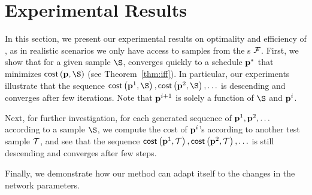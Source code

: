 \section{Experimental Results}\label{sec:exp}
In this section, we present our experimental results on optimality and efficiency of {\appoptimizer}, as in realistic scenarios we only have access to samples from the {\ins}s $\mathcal{F}$. First, we show that for a given sample $\S$, {\appoptimizer} converges quickly to a schedule $\mathbf{p}^*$ that minimizes $\cost{\p, \S}$ (see Theorem~\ref{thm:iff}). In particular, our experiments illustrate that the sequence $\cost{\p^1,\S}, \cost{\p^2, \S}, \ldots$ is descending and converges after few iterations.
Note that $\mathbf{p}^{i+1}$ is solely a function of $\S$ and $\mathbf{p}^i$. 

Next, for further investigation, for each generated sequence of $\mathbf{p}^1,\mathbf{p}^2,\ldots$ according to a sample $\S$, we compute the cost of $\mathbf{p}^i$'s according to another test sample $\mathcal{T}$, and see that the sequence $\mathsf{cost}\left( \mathbf{p}^1,\mathcal{T} \right), \mathsf{cost}\left( \mathbf{p}^2,\mathcal{T} \right),\ldots$ is still descending and converges after few steps.

Finally, we demonstrate how our method can adapt itself to the changes in the network parameters.


